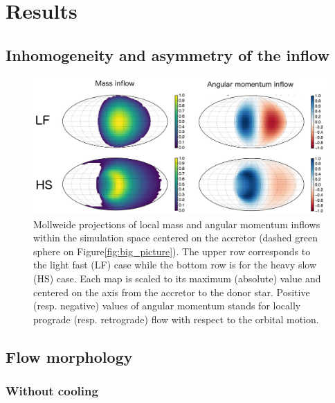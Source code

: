 \documentclass[a4paper,fleqn,usenatbib]{mnras}
\begin{document}
\section{Results}
\label{sec:res}

\subsection{Inhomogeneity and asymmetry of the inflow}
\label{sec:asymm}

\begin{figure}
\centering
\includegraphics[width=2\columnwidth]{Pictures/inflow_maps.png}
\caption{Mollweide projections of local mass and angular momentum inflows within the simulation space centered on the accretor (dashed green sphere on Figure\ref{fig:big_picture}). The upper row corresponds to the light fast (LF) case while the bottom row is for the heavy slow (HS) case. Each map is scaled to its maximum (absolute) value and centered on the axis from the accretor to the donor star. Positive (resp. negative) values of angular momentum stands for locally prograde (resp. retrograde) flow with respect to the orbital motion.}
\label{fig:inflow_maps}
\end{figure} 

\subsection{Flow morphology}
\label{sec:morph}

\subsubsection{Without cooling}
\label{sec:cool_F}
\end{document}
